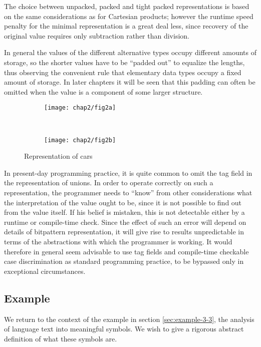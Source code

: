 The choice between unpacked, packed and tight packed representations is based on the same considerations as for Cartesian products; however the runtime speed penalty for the minimal representation is a great deal less, since recovery of the original value requires only subtraction rather than division.

In general the values of the different alternative types occupy different amounts of storage, so the shorter values have to be ``padded out'' to equalize the lengths, thus observing the convenient rule that elementary data types occupy a fixed amount of storage. In later chapters it will be seen that this padding can often be omitted when the value is a component of some larger structure.

\begin{figure}[ht!]
	\centering
	\begin{subfigure}[b]{0.4\textwidth}
		\centering
		\texttt{[image: chap2/fig2a]}
	\end{subfigure}
	~
	\begin{subfigure}[b]{0.4\textwidth}
		\centering
		\texttt{[image: chap2/fig2b]}
	\end{subfigure}	
	\caption{Representation of cars}
\end{figure}

In present-day programming practice, it is quite common to omit the tag field in the representation of unions. In order to operate correctly on such a representation, the programmer needs to ``know'' from other considerations what the interpretation of the value ought to be, since it is not possible to find out from the value itself. If his belief is mistaken, this is not detectable either by a runtime or compile-time check. Since the effect of such an error will depend on details of bitpattern representation, it will give rise to results unpredictable in terms of the abstractions with which the programmer is working. It would therefore in general seem advisable to use tag fields and compile-time checkable case discrimination as standard programming practice, to be bypassed only in exceptional circumstances.

\subsection{Example}

We return to the context of the example in section \ref{sec:example-3-3}, the analysis of language text into meaningful symbols. We wish to give a rigorous abstract definition of what these symbols are.

